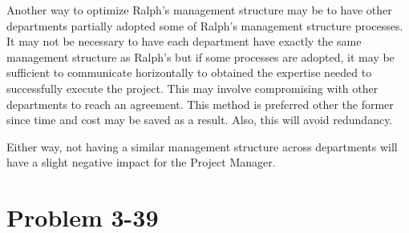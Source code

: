 \documentclass[letterpaper,10pt]{article}
\begin{document}
Another way to optimize Ralph's management structure may be to have other departments partially adopted some of Ralph's management structure processes. It may not be necessary to have each department have exactly the same management structure as Ralph's but if some processes are adopted, it may be sufficient to communicate horizontally to obtained the expertise needed to successfully execute the project. This may involve compromising with other departments to reach an agreement. This method is preferred other the former since time and cost may be saved as a result. Also, this will avoid redundancy. 

Either way, not having a similar management structure across departments will have a slight negative impact for the Project Manager.

\section*{Problem 3-39}
\end{document}
